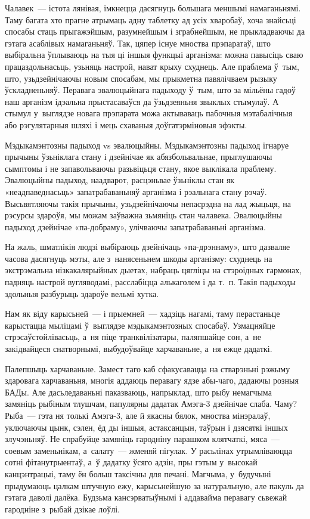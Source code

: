 Чалавек~--- істота лянівая, імкнецца дасягнуць большага меншымі намаганьнямі. Таму багата хто прагне атрымаць адну таблетку ад усіх хваробаў, хоча знайсьці спосабы стаць прыгажэйшым, разумнейшым і зграбнейшым, не прыкладваючы да гэтага асаблівых намаганьняў. Так, цяпер існуе мноства прэпаратаў, што выбіральна ўплываюць на тыя ці іншыя функцыі арганізма: можна павысіць сваю працаздольнасьць, узьняць настрой, нават крыху схуднець. Але праблема ў~тым, што, узьдзейнічаючы новым спосабам, мы прыкметна павялічваем рызыку ўскладненьняў. Перавага эвалюцыйнага падыходу ў~тым, што за мільёны гадоў наш арганізм ідэальна прыстасаваўся да ўзьдзеяньня звыклых стымулаў. А стымул у~выглядзе новага прэпарата можа актываваць пабочныя мэтабалічныя або рэгулятарныя шляхі і мець схаваныя доўгатэрміновыя эфэкты.

Мэдыкамэнтозны падыход vs эвалюцыйны. Мэдыкамэнтозны падыход ігнаруе прычыны ўзьніклага стану і дзейнічае як абязбольвальнае, прыглушаючы сымптомы і не запавольваючы разьвіцьця стану, якое выклікала праблему. Эвалюцыйны падыход, наадварот, расцэньвае ўзьніклы стан як «неадпаведнасьць» запатрабаваньняў арганізма і рэальнага стану рэчаў. Высьвятляючы такія прычыны, узьдзейнічаючы непасрэдна на лад жыцьця, на рэсурсы здароўя, мы можам заўважна зьмяніць стан чалавека. Эвалюцыйны падыход дзейнічае «па-добраму», улічваючы запатрабаваньні арганізма.

На жаль, шматлікія людзі выбіраюць дзейнічаць «па-дрэннаму», што дазваляе часова дасягнуць мэты, але з~нанясеньнем шкоды арганізму: схуднець на экстрэмальна нізкакалярыйных дыетах, набраць цягліцы на стэроідных гармонах, падняць настрой вугляводамі, расслабіцца алькаголем і да т.~п. Такія падыходы здольныя разбурыць здароўе вельмі хутка.

Нам як віду карысьней~--- і прыемней~--- хадзіць нагамі, таму перастаньце карыстацца мыліцамі ў~выглядзе мэдыкамэнтозных спосабаў. Узмацняйце стрэсаўстойлівасьць, а~ня піце транквілізатары, паляпшайце сон, а~не закідвайцеся снатворнымі, выбудоўвайце харчаваньне, а~ня ежце дадаткі.

Палепшыць харчаваньне. Замест таго каб сфакусавацца на стварэньні рэжыму здаровага харчаваньня, многія аддаюць перавагу ядзе абы-чаго, дадаючы розныя БАДы. Але дасьледаваньні паказваюць, напрыклад, што рыбу немагчыма замяніць рыбіным тлушчам, папулярны дадатак Амэга-3 дзейнічае слаба. Чаму? Рыба~--- гэта ня толькі Амэга-3, але й якасны бялок, мноства мінэралаў, уключаючы цынк, сэлен, ёд ды іншыя, астаксанцын, таўрын і дзясяткі іншых злучэньняў. Не спрабуйце замяніць гародніну парашком клятчаткі, мяса~--- соевым заменьнікам, а~салату~--- жменяй пігулак. У расьлінах утрымліваюцца сотні фітанутрыентаў, а~ў дадатку ўсяго адзін, пры гэтым у~высокай канцэнтрацыі, таму ён больш таксічны для печані. Магчыма, у~будучыні прыдумаюць цалкам штучную ежу, карысьнейшую за натуральную, але пакуль да гэтага даволі далёка. Будзьма кансэрватыўнымі і аддавайма перавагу сьвежай гародніне з~рыбай дзікае лоўлі.

